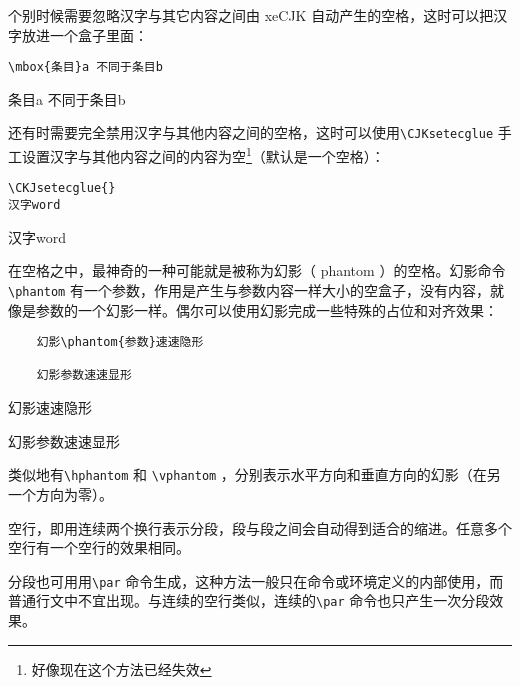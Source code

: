 个别时候需要忽略汉字与其它内容之间由 xeCJK 自动产生的空格，这时可以把汉字放进一个盒子里面：

\begin{minipage}[t]{0.45\textwidth}
\begin{lstlisting}[showspaces=true]
\mbox{条目}a 不同于条目b
\end{lstlisting}
\end{minipage}
\hfill
\begin{minipage}[t]{0.45\textwidth}
\mbox{条目}a 不同于条目b
\end{minipage}

还有时需要完全禁用汉字与其他内容之间的空格，这时可以使用\verb|\CJKsetecglue| 手工设置汉字与其他内容之间的内容为空\footnote{好像现在这个方法已经失效}（默认是一个空格）：

\begin{minipage}[t]{0.45\textwidth}
\begin{lstlisting}
\CKJsetecglue{}
汉字word
\end{lstlisting}
\end{minipage}
\hfill
\begin{minipage}[t]{0.45\textwidth}
\mbox{汉字}word 
\end{minipage}

在空格之中，最神奇的一种可能就是被称为幻影（ phantom ）的空格。幻影命令\verb|\phantom| 有一个参数，作用是产生与参数内容一样大小的空盒子，没有内容，就像是参数的一个幻影一样。偶尔可以使用幻影完成一些特殊的占位和对齐效果：

\begin{minipage}[t]{0.45\textwidth}
\begin{lstlisting}
    幻影\phantom{参数}速速隐形

    幻影参数速速显形
\end{lstlisting}
\end{minipage}
\hfill
\begin{minipage}[t]{0.45\textwidth}
    幻影\phantom{参数}速速隐形

    幻影参数速速显形
\end{minipage}

类似地有\verb|\hphantom| 和 \verb|\vphantom| ，分别表示水平方向和垂直方向的幻影（在另一个方向为零）。

空行，即用连续两个换行表示分段，段与段之间会自动得到适合的缩进。任意多个空行有一个空行的效果相同。

分段也可用用\verb|\par| 命令生成，这种方法一般只在命令或环境定义的内部使用，而普通行文中不宜出现。与连续的空行类似，连续的\verb|\par| 命令也只产生一次分段效果。


